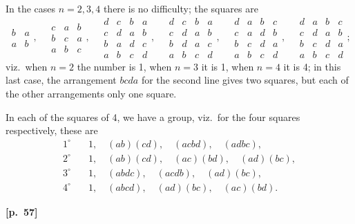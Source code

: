 \documentclass[11pt,a4paper]{book}
\begin{document}
In the cases $n = 2, 3, 4$ there is no difficulty; the squares are
$$
\begin{array}{cc}
b & a \\
a & b
\end{array},
\quad
\begin{array}{ccc}
c & a & b \\
b & c & a \\
a & b & c
\end{array},
\quad
\begin{array}{cccc}
d & c & b & a \\
c & d & a & b \\
b & a & d & c \\
a & b & c & d
\end{array},
\quad
\begin{array}{cccc}
d & c & b & a \\
c & d & a & b \\
b & d & a & c \\
a & b & c & d
\end{array},
\quad
\begin{array}{cccc}
d & a & b & c \\
c & a & d & b \\
b & c & d & a \\
a & b & c & d
\end{array},
\quad
\begin{array}{cccc}
d & a & b & c \\
c & d & a & b \\
b & c & d & a \\
a & b & c & d
\end{array};
$$
viz.\ when $n = 2$ the number is 1, when $n = 3$ it is 1, when $n = 4$ it is 4; in this last case, the arrangement $bcda$ for the second line gives two squares, but each of the other arrangements only one square.

In each of the squares of 4, we have a group, viz.\ for the four squares respectively, these are
\begin{align*}
1^\circ &\quad 1, \quad (ab)(cd), \quad (acbd), \quad (adbc), \\
2^\circ &\quad 1, \quad (ab)(cd), \quad (ac)(bd), \quad (ad)(bc), \\
3^\circ &\quad 1, \quad (abdc), \quad (acdb), \quad (ad)(bc), \\
4^\circ &\quad 1, \quad (abcd), \quad (ad)(bc), \quad (ac)(bd).
\end{align*}

\vspace{0.5em}
\noindent\textbf{[p.\ 57]}
\end{document}
